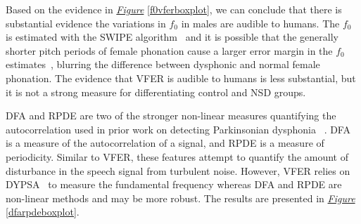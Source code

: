\documentclass[12pt, twoside]{book}
\begin{document}
Based on the evidence in \textit{\hyperref[f0vferboxplot]{Figure}} \ref{f0vferboxplot}, we can conclude that there is substantial evidence the variations in $f_0$ in males are audible to humans. The $f_0$ is estimated with the SWIPE algorithm~\cite{camacho2007swipe} and it is possible that the generally shorter pitch periods of female phonation cause a larger error margin in the $f_0$ estimates~\cite{f0estimation}, blurring the difference between dysphonic and normal female phonation. The evidence that VFER is audible to humans is less substantial, but it is not a strong measure for differentiating control and NSD groups.

DFA and RPDE are two of the stronger non-linear measures quantifying the autocorrelation used in prior work on detecting Parkinsonian dysphonia ~\cite{splittledysphonia2009}. DFA is a measure of the autocorrelation of a signal, and RPDE is a measure of periodicity. Similar to VFER, these features attempt to quantify the amount of disturbance in the speech signal from turbulent noise. However, VFER relies on DYPSA~\cite{dypsa} to measure the fundamental frequency whereas DFA and RPDE are non-linear methods and may be more robust. The results are presented in \textit{\hyperref[dfarpdeboxplot]{Figure}} \ref{dfarpdeboxplot}. 

\end{document}
